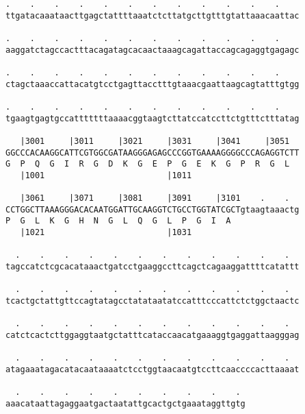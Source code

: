 \documentclass{article}
\begin{document}
\begin{Verbatim}
.    .    .    .    .    .    .    .    .    .    .    .    
ttgatacaaataacttgagctattttaaatctcttatgcttgtttgtattaaacaattac
                                                            
.    .    .    .    .    .    .    .    .    .    .    .    
aaggatctagccactttacagatagcacaactaaagcagattaccagcagaggtgagagc
                                                            
.    .    .    .    .    .    .    .    .    .    .    .    
ctagctaaaccattacatgtcctgagttacctttgtaaacgaattaagcagtatttgtgg
                                                            
.    .    .    .    .    .    .    .    .    .    .    .    
tgaagtgagtgccatttttttaaaacggtaagtcttatccatccttctgtttctttatag
                                                            
   |3001     |3011     |3021     |3031     |3041     |3051  
GGCCCACAAGGCATTCGTGGCGATAAGGGAGAGCCCGGTGAAAAGGGGCCCAGAGGTCTT
G  P  Q  G  I  R  G  D  K  G  E  P  G  E  K  G  P  R  G  L  
   |1001                         |1011                      
  
   |3061     |3071     |3081     |3091     |3101    .    .  
CCTGGCTTAAAGGGACACAATGGATTGCAAGGTCTGCCTGGTATCGCTgtaagtaaactg
P  G  L  K  G  H  N  G  L  Q  G  L  P  G  I  A              
   |1021                         |1031                      
  
  .    .    .    .    .    .    .    .    .    .    .    .  
tagccatctcgcacataaactgatcctgaaggccttcagctcagaaggattttcatattt
                                                            
  .    .    .    .    .    .    .    .    .    .    .    .  
tcactgctattgttccagtatagcctatataatatccatttcccattctctggctaactc
                                                            
  .    .    .    .    .    .    .    .    .    .    .    .  
catctcactcttggaggtaatgctatttcataccaacatgaaaggtgaggattaagggag
                                                            
  .    .    .    .    .    .    .    .    .    .    .    .  
atagaaatagacatacaataaaatctcctggtaacaatgtccttcaaccccacttaaaat
                                                            
  .    .    .    .    .    .    .    .    .    . 
aaacataattagaggaatgactaatattgcactgctgaaataggttgtg
                                                 
                                                 
 

\end{Verbatim}
\end{document}
